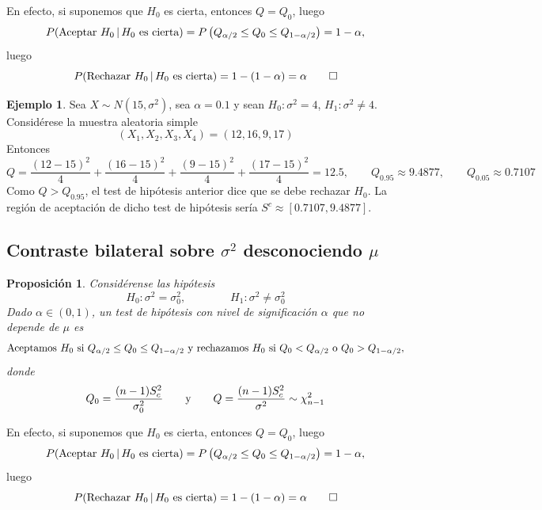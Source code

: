 \documentclass[11pt]{report}
\makeatletter
\renewenvironment{proof}[1][\proofname]{\par
  \pushQED{\qed}%
  \normalfont \topsep\z@skip %
  \trivlist
  \item[\hskip\labelsep
        \itshape
    #1\@addpunct{.}]\ignorespaces
}{%
  \popQED\endtrivlist\@endpefalse
}
\newtheorem{proposition}{Proposición}
\theoremstyle{definition}
\newtheorem{example}{Ejemplo}
\makeatother
\begin{document}
\begin{proof}
    En efecto, si suponemos que $H_0$ es cierta, entonces $Q = Q_0$, luego
    \[P(\textup{Aceptar } H_0 \, | \, H_0 \textup{ es cierta}) = P\left(Q_{\alpha/2} \leq Q_0 \leq Q_{1-\alpha/2}\right) = 1-\alpha,\]
    luego
    \[P(\textup{Rechazar } H_0 \, | \, H_0 \textup{ es cierta}) = 1-(1-\alpha) = \alpha \qedhere\]
\end{proof}

\begin{example}
Sea $X \sim N(15, \sigma^2)$, sea $\alpha=0.1$ y sean $H_0 \colon \sigma^2 = 4$, $H_1 \colon \sigma^2 \neq 4$. Considérese la muestra aleatoria simple
\[(X_1,X_2,X_3,X_4) = (12,16,9,17)\]
Entonces
\[Q = \frac{(12-15)^2}{4}+\frac{(16-15)^2}{4}+\frac{(9-15)^2}{4}+\frac{(17-15)^2}{4} =12.5 , \qquad Q_{0.95} \approx9.4877, \qquad Q_{0.05} \approx0.7107\]
Como $Q>Q_{0.95}$, el test de hipótesis anterior dice que se debe rechazar $H_0$. La región de aceptación de dicho test de hipótesis sería $S^c \approx [0.7107,9.4877]$.
\end{example}

\subsection{Contraste bilateral sobre \texorpdfstring{$\sigma^2$}{TEXT} desconociendo \texorpdfstring{$\mu$}{TEXT}}

\begin{proposition}
    Considérense las hipótesis
    \[H_0 \colon \sigma^2 = \sigma^2_0, \qquad \qquad H_1 \colon \sigma^2  \neq \sigma^2_0\]
    Dado $\alpha \in (0,1)$, un test de hipótesis con nivel de significación $\alpha$ que no depende de $\mu$ es
    \[\textup{{Aceptamos} } H_0 \textup{ {si} } Q_{\alpha/2} \leq Q_0 \leq Q_{1-\alpha/2} \textup{ {y rechazamos} } H_0 \textup{ {si} } Q_0 < Q_{\alpha/2} \textup{ o } Q_0 > Q_{1-\alpha/2},\]
    donde
    \[Q_0=\frac{(n-1)S^2_c}{\sigma_0^2} \qquad \textup{y} \qquad Q=\frac{(n-1)S^2_c}{\sigma^2} \sim \chi^2_{n-1}\]
\end{proposition}

\begin{proof}
    En efecto, si suponemos que $H_0$ es cierta, entonces $Q = Q_0$, luego
    \[P(\textup{Aceptar } H_0 \, | \, H_0 \textup{ es cierta}) = P\left(Q_{\alpha/2} \leq Q_0 \leq Q_{1-\alpha/2}\right) = 1-\alpha,\]
    luego
    \[P(\textup{Rechazar } H_0 \, | \, H_0 \textup{ es cierta}) = 1-(1-\alpha) = \alpha \qedhere\]
\end{proof}
\end{document}
